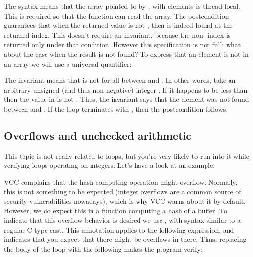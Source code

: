 {{\noindent
The syntax  means that the
array pointed to by , with  elements is thread-local.
This is required so that the function can read the array.
The postcondition guarantees that when the returned value
is not , then  is indeed found at the returned
index.
This doesn't require an invariant, because the non- index
is returned only under that condition.
However this specification is not full: what about the case when the result is not found?
To express that an element is not in an array we will use a universal quantifier:


\noindent
The invariant  means that 
 is not  for all  between  and .
In other words, take an arbitrary unsigned (and thus non-negative) integer . 
If it happens to be less than  then the value in  is not .
Thus, the invariant says that the element was not found between 
and .
If the loop terminates with , then the postcondition follows.

\subsection{Overflows and unchecked arithmetic}
\label{sect:overflows}

This topic is not really related to loops, but you're very likely to run into it
while verifying loops operating on integers.
Let's have a look at an example:


\noindent
VCC complains that the hash-computing operation might overflow.
Normally, this is not something to be expected (integer overflows
are a common source of security vulnerabilities nowadays),
which is why VCC warns about it by default.
However, we do expect this in a function computing a hash of a buffer.
To indicate that this overflow behavior is desired we use ,
with syntax similar to a regular C type-cast.
This annotation applies to the following expression, and indicates that
you expect that there might be overflows in there.
Thus, replacing the body of the loop with the following
makes the program verify:


}}
